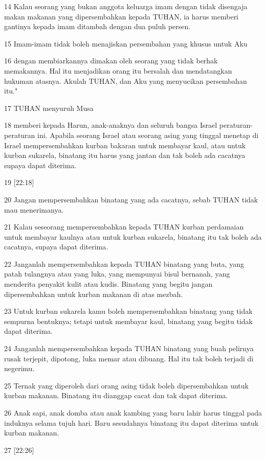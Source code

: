 \par 14 Kalau seorang yang bukan anggota keluarga imam dengan tidak disengaja makan makanan yang dipersembahkan kepada TUHAN, ia harus memberi gantinya kepada imam ditambah dengan dua puluh persen.
\par 15 Imam-imam tidak boleh menajiskan persembahan yang khusus untuk Aku
\par 16 dengan membiarkannya dimakan oleh seorang yang tidak berhak memakannya. Hal itu menjadikan orang itu bersalah dan mendatangkan hukuman atasnya. Akulah TUHAN, dan Aku yang menyucikan persembahan itu."
\par 17 TUHAN menyuruh Musa
\par 18 memberi kepada Harun, anak-anaknya dan seluruh bangsa Israel peraturan-peraturan ini. Apabila seorang Israel atau seorang asing yang tinggal menetap di Israel mempersembahkan kurban bakaran untuk membayar kaul, atau untuk kurban sukarela, binatang itu harus yang jantan dan tak boleh ada cacatnya supaya dapat diterima.
\par 19 [22:18]
\par 20 Jangan mempersembahkan binatang yang ada cacatnya, sebab TUHAN tidak mau menerimanya.
\par 21 Kalau seseorang mempersembahkan kepada TUHAN kurban perdamaian untuk membayar kaulnya atau untuk kurban sukarela, binatang itu tak boleh ada cacatnya, supaya dapat diterima.
\par 22 Janganlah mempersembahkan kepada TUHAN binatang yang buta, yang patah tulangnya atau yang luka, yang mempunyai bisul bernanah, yang menderita penyakit kulit atau kudis. Binatang yang begitu jangan dipersembahkan untuk kurban makanan di atas mezbah.
\par 23 Untuk kurban sukarela kamu boleh mempersembahkan binatang yang tidak sempurna bentuknya; tetapi untuk membayar kaul, binatang yang begitu tidak dapat diterima.
\par 24 Janganlah mempersembahkan kepada TUHAN binatang yang buah pelirnya rusak terjepit, dipotong, luka memar atau dibuang. Hal itu tak boleh terjadi di negerimu.
\par 25 Ternak yang diperoleh dari orang asing tidak boleh dipersembahkan untuk kurban makanan. Binatang itu dianggap cacat dan tak dapat diterima.
\par 26 Anak sapi, anak domba atau anak kambing yang baru lahir harus tinggal pada induknya selama tujuh hari. Baru sesudahnya binatang itu dapat diterima untuk kurban makanan.
\par 27 [22:26]
